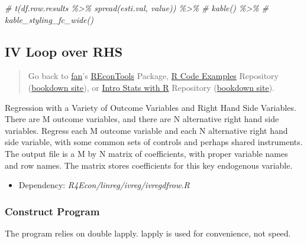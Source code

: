 \documentclass[
]{book}
\newenvironment{Shaded}{\begin{snugshade}}{\end{snugshade}}
\newcommand{\CommentTok}[1]{\textcolor[rgb]{0.56,0.35,0.01}{\textit{#1}}}
\providecommand{\tightlist}{%
  \setlength{\itemsep}{0pt}\setlength{\parskip}{0pt}}
\begin{document}
\begin{Shaded}
\begin{Highlighting}[]
\CommentTok{\# t(df.row.results \%\textgreater{}\% spread(esti.val, value)) \%\textgreater{}\%}
\CommentTok{\#   kable() \%\textgreater{}\%}
\CommentTok{\#   kable\_styling\_fc\_wide()}
\end{Highlighting}
\end{Shaded}

\hypertarget{iv-loop-over-rhs}{%
\subsection{IV Loop over RHS}\label{iv-loop-over-rhs}}

\begin{quote}
Go back to \href{http://fanwangecon.github.io/}{fan}'s \href{https://fanwangecon.github.io/REconTools/}{REconTools} Package, \href{https://fanwangecon.github.io/R4Econ/}{R Code Examples} Repository (\href{https://fanwangecon.github.io/R4Econ/bookdown}{bookdown site}), or \href{https://fanwangecon.github.io/Stat4Econ/}{Intro Stats with R} Repository (\href{https://fanwangecon.github.io/Stat4Econ/bookdown}{bookdown site}).
\end{quote}

Regression with a Variety of Outcome Variables and Right Hand Side Variables. There are M outcome variables, and there are N alternative right hand side variables. Regress each M outcome variable and each N alternative right hand side variable, with some common sets of controls and perhaps shared instruments. The output file is a M by N matrix of coefficients, with proper variable names and row names. The matrix stores coefficients for this key endogenous variable.

\begin{itemize}
\tightlist
\item
  Dependency: \emph{R4Econ/linreg/ivreg/ivregdfrow.R}
\end{itemize}

\hypertarget{construct-program-1}{%
\subsubsection{Construct Program}\label{construct-program-1}}

The program relies on double lapply. lapply is used for convenience, not speed.
\end{document}

